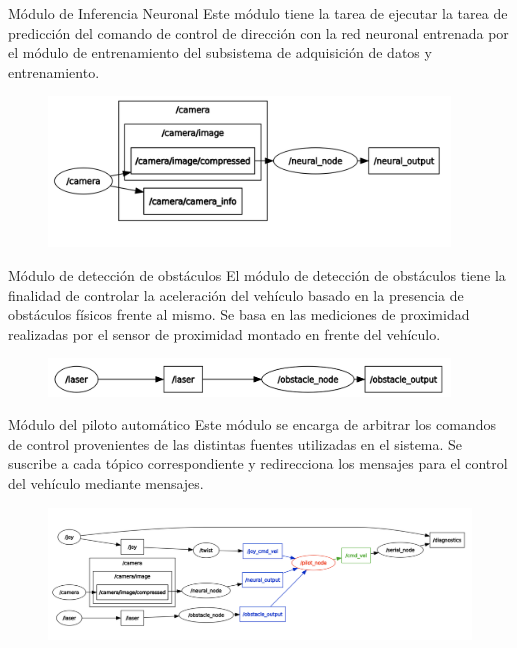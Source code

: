 \documentclass[10pt]{beamer}
\begin{document}
\begin{frame}{Módulo de Inferencia Neuronal}
    Este módulo tiene la tarea de ejecutar la tarea de predicción del comando de control de dirección con la red neuronal 
    entrenada por el módulo de entrenamiento del subsistema de adquisición de datos y entrenamiento.
    \begin{figure}[!h] 
        \centering
        \includegraphics[width=0.95\textwidth]{../img/nodosneural}
        \end{figure}
\end{frame}


\begin{frame}{Módulo de detección de obstáculos}
    El módulo de detección de obstáculos tiene la finalidad de controlar la aceleración del vehículo basado en la 
    presencia de obstáculos físicos frente al mismo. Se basa en las mediciones de proximidad realizadas por el 
    sensor de proximidad montado en frente del vehículo. 

    \begin{figure}[!h] 
        \centering
        \includegraphics[width=0.95\textwidth]{../img/nodosobs}
        \end{figure}
\end{frame}


\begin{frame}{Módulo del piloto automático}
    Este módulo se encarga de arbitrar los comandos de control provenientes de las distintas fuentes utilizadas en el sistema. Se 
    suscribe a cada tópico correspondiente y redirecciona los mensajes para el control del vehículo mediante mensajes.

    \begin{figure}[!ht] 
        \centering
        \includegraphics[width=\textwidth]{../img/nodesauto}
        \end{figure}

\end{frame}
\end{document}
